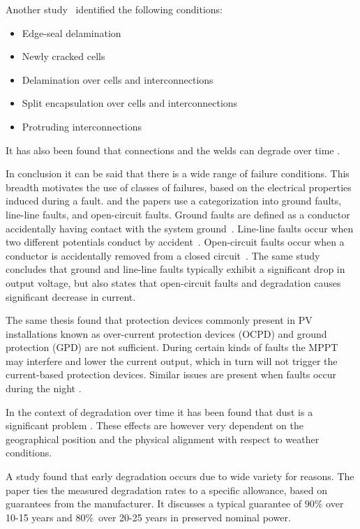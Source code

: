 Another study~\cite{Forman1982} identified the following conditions:
\begin{itemize}
\item Edge-seal delamination
\item Newly cracked cells
\item Delamination over cells and interconnections
\item Split encapsulation over cells and interconnections
\item Protruding interconnections
\end{itemize}

It has also been found that connections and the welds can degrade over time \cite{Houssein2010}.

In conclusion it can be said that there is a wide range of failure conditions.
This breadth motivates the use of classes of failures, based on the electrical properties induced during a fault.
\cite{Zhao2010thesis} and the papers \cite{Zhao2012tree,Zhao2013graph,Zhao2013outlier} use a categorization into ground faults, line-line faults, and open-circuit faults.
Ground faults are defined as a conductor accidentally having contact with the system ground~\cite{Zhao2010thesis}.
Line-line faults occur when two different potentials conduct by accident~\cite{Zhao2010thesis}.
Open-circuit faults occur when a conductor is accidentally removed from a closed circuit~\cite{Zhao2010thesis}.
The same study concludes that ground and line-line faults typically exhibit a significant drop in output voltage,
but also states that open-circuit faults and degradation causes significant decrease in current.

The same thesis found that protection devices commonly present in PV installations known as over-current protection devices (OCPD) and ground protection (GPD) are not sufficient.
During certain kinds of faults the MPPT may interfere and lower the current output, which in turn will not trigger the current-based protection devices.
Similar issues are present when faults occur during the night \cite{Zhao2010night}.

In the context of degradation over time it has been found that dust is a significant problem \cite{Mani2010}.
These effects are however very dependent on the geographical position and the physical alignment with respect to weather conditions.

A study \cite{Munoz2011} found that early degradation occurs due to wide variety for reasons.
The paper ties the measured degradation rates to a specific allowance, based on guarantees from the manufacturer.
It discusses a typical guarantee of $90\%$ over 10-15 years and $80\%$ over 20-25 years in preserved nominal power.

